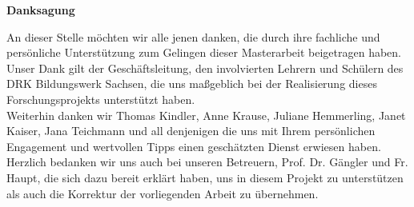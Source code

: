 \vspace*{\fill}
\begin{center}
\textbf{Danksagung}
\end{center}

\noindent 
An dieser Stelle möchten wir alle jenen danken, die durch ihre fachliche und persönliche Unterstützung zum Gelingen dieser Masterarbeit beigetragen haben.\\[0,5cm]
Unser Dank gilt der Geschäftsleitung, den involvierten Lehrern und Schülern des DRK Bildungswerk Sachsen, die uns maßgeblich bei der Realisierung dieses Forschungsprojekts unterstützt haben.\\[0,5cm]
Weiterhin danken wir Thomas Kindler, Anne Krause, Juliane Hemmerling, Janet Kaiser, Jana Teichmann und all denjenigen die uns mit Ihrem persönlichen Engagement und wertvollen Tipps einen geschätzten Dienst erwiesen haben.\\[0,5cm]
Herzlich bedanken wir uns auch bei unseren Betreuern, Prof. Dr. Gängler und Fr. Haupt, die sich dazu bereit erklärt haben, uns in diesem Projekt zu unterstützen als auch die Korrektur der vorliegenden Arbeit zu übernehmen.
\vspace{\fill}
